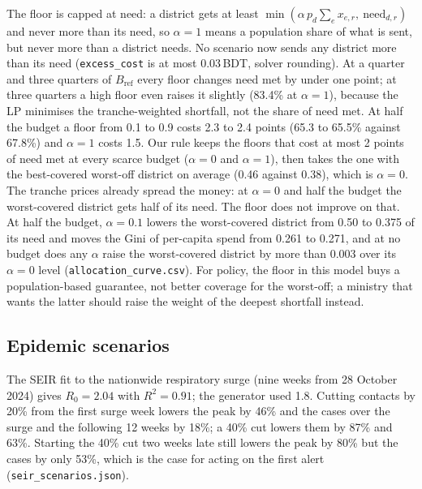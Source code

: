  The floor is capped at need: a district gets at least
$\min(\alpha\,p_d\sum_e x_{e,r},\ \text{need}_{d,r})$ and never more than its need, so $\alpha=1$ means a
population share of what is sent, but never more than a district needs. No scenario now sends any district
more than its need (\texttt{excess\_cost} is at most 0.03\,BDT, solver rounding). At a quarter and three quarters of $B_{\text{ref}}$
every floor changes need met by under one point; at three quarters a high floor even raises it slightly (83.4\% at $\alpha=1$), because the LP minimises the tranche-weighted shortfall, not the share of need met. At half the budget a floor from 0.1 to 0.9 costs 2.3 to 2.4 points
(65.3 to 65.5\% against 67.8\%) and $\alpha=1$ costs 1.5. Our rule keeps the floors that cost at most 2 points of need met at every scarce budget
($\alpha=0$ and $\alpha=1$), then takes the one with the best-covered worst-off district on average (0.46 against
0.38), which is $\alpha=0$. The tranche prices already
spread the money: at $\alpha=0$ and half the budget the worst-covered district gets half of its need. The floor
does not improve on that. At half the budget, $\alpha=0.1$ lowers the worst-covered district from 0.50 to 0.375
of its need and moves the Gini of per-capita spend from 0.261 to 0.271, and at no budget does any $\alpha$
raise the worst-covered district by more than 0.003 over its $\alpha=0$ level (\texttt{allocation\_curve.csv}).
For policy, the floor in this model buys a population-based guarantee, not better coverage for the worst-off; a
ministry that wants the latter should raise the weight of the deepest shortfall instead.

\subsection{Epidemic scenarios}
The SEIR fit to the nationwide respiratory surge (nine weeks from 28 October 2024) gives $R_0=2.04$ with
$R^2=0.91$; the generator used 1.8. Cutting contacts by 20\% from the first surge week lowers the peak by 46\%
and the cases over the surge and the following 12 weeks by 18\%; a 40\% cut lowers them by 87\% and 63\%.
Starting the 40\% cut two weeks late still lowers the peak by 80\% but the cases by only 53\%, which is the
case for acting on the first alert (\texttt{seir\_scenarios.json}).

